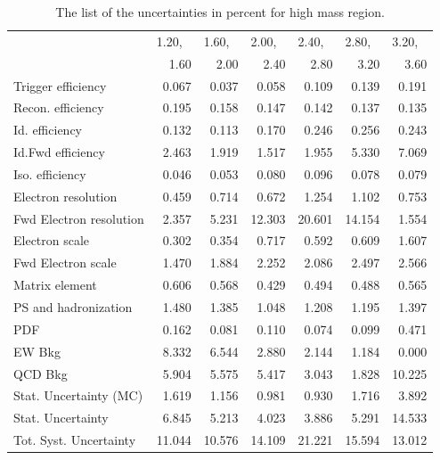\begin{table}
\centering
\begin{tabular}{l r r r r r r}
\hline \hline
   & \multicolumn{1}{l}{1.20,} & \multicolumn{1}{l}{1.60,} & \multicolumn{1}{l}{2.00,}
   & \multicolumn{1}{l}{2.40,} & \multicolumn{1}{l}{2.80,} & \multicolumn{1}{l}{3.20,}  \\
   & 1.60  & 2.00  & 2.40  & 2.80  & 3.20  & 3.60  \\
\hline
Trigger efficiency            & 0.067 & 0.037 & 0.058 & 0.109 & 0.139 & 0.191  \\
Recon. efficiency             & 0.195 & 0.158 & 0.147 & 0.142 & 0.137 & 0.135  \\
Id. efficiency                & 0.132 & 0.113 & 0.170 & 0.246 & 0.256 & 0.243  \\
Id.Fwd efficiency             & 2.463 & 1.919 & 1.517 & 1.955 & 5.330 & 7.069  \\
Iso. efficiency               & 0.046 & 0.053 & 0.080 & 0.096 & 0.078 & 0.079  \\
Electron resolution           & 0.459 & 0.714 & 0.672 & 1.254 & 1.102 & 0.753  \\
Fwd Electron resolution       & 2.357 & 5.231 & 12.303 & 20.601 & 14.154 & 1.554  \\
Electron scale                & 0.302 & 0.354 & 0.717 & 0.592 & 0.609 & 1.607  \\
Fwd Electron scale            & 1.470 & 1.884 & 2.252 & 2.086 & 2.497 & 2.566  \\
Matrix element                & 0.606 & 0.568 & 0.429 & 0.494 & 0.488 & 0.565  \\
PS and hadronization          & 1.480 & 1.385 & 1.048 & 1.208 & 1.195 & 1.397  \\
PDF                           & 0.162 & 0.081 & 0.110 & 0.074 & 0.099 & 0.471  \\
EW Bkg                        & 8.332 & 6.544 & 2.880 & 2.144 & 1.184 & 0.000  \\
QCD Bkg                       & 5.904 & 5.575 & 5.417 & 3.043 & 1.828 & 10.225  \\
\hline
Stat. Uncertainty (MC)        & 1.619 & 1.156 & 0.981 & 0.930 & 1.716 & 3.892  \\
Stat. Uncertainty             & 6.845 & 5.213 & 4.023 & 3.886 & 5.291 & 14.533  \\
\hline
Tot. Syst. Uncertainty        & 11.044 & 10.576 & 14.109 & 21.221 & 15.594 & 13.012 \\
\hline \hline
\end{tabular}
\caption{The list of the uncertainties in percent for high mass region.}
\label{tab:Zee_unc_list_high}
\end{table}

